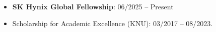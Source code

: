
\begin{itemize}
\item \textbf{SK Hynix Global Fellowship}: 06/2025 -- Present
\item Scholarship for Academic Excellence (KNU): 03/2017 -- 08/2023.
\end{itemize}







